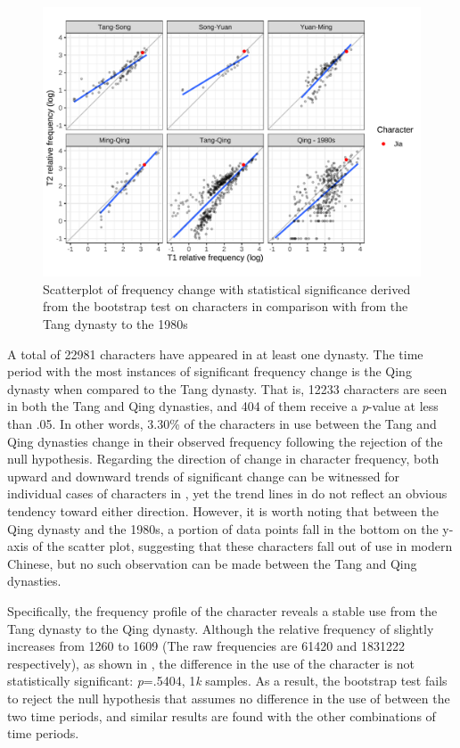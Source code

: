 \nopagebreak
\begin{figure}[H]
  \centering
  \includegraphics[height=0.4\textheight,keepaspectratio]{figures_new/char_freq/char_freq_change_lm.pdf}
  \caption{Scatterplot of frequency change with statistical significance derived from the bootstrap test on characters in comparison with \jia from the Tang dynasty to the 1980s}
  \label{fig:freq_boot_lm}
\end{figure}

A total of \num{22981} characters have appeared in at least one dynasty. The time period with the most instances of significant frequency change is the Qing dynasty when compared to the Tang dynasty. That is, \num{12233} characters are seen in both the Tang and Qing dynasties, and \num{404} of them receive a \textit{p}-value at less than .05. In other words, 3.30\% of the characters in use between the Tang and Qing dynasties change in their observed frequency following the rejection of the null hypothesis. Regarding the direction of change in character frequency, both upward and downward trends of significant change can be witnessed for individual cases of characters in , yet the trend lines in  do not reflect an obvious tendency toward either direction. However, it is worth noting that between the Qing dynasty and the 1980s, a portion of data points fall in the bottom on the y-axis of the scatter plot, suggesting that these characters fall out of use in modern Chinese, but no such observation can be made between the Tang and Qing dynasties.

Specifically, the frequency profile of the character \jia reveals a stable use from the Tang dynasty to the Qing dynasty. Although the relative frequency of \jia slightly increases from \num{1260} to \num{1609} (The raw frequencies are \num{61420} and \num{1831222} respectively), as shown in , the difference in the use of the character is not statistically significant: \textit{p}=.5404, 1\textit{k} samples. As a result, the bootstrap test fails to reject the null hypothesis that assumes no difference in the use of \jia between the two time periods, and similar results are found with the other combinations of time periods.

